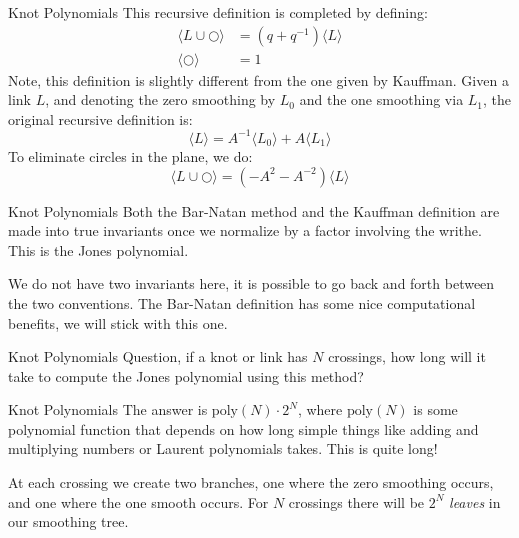 \documentclass{beamer}
\begin{document}
    \begin{frame}{Knot Polynomials}
        This recursive definition is completed by defining:
        \begin{align}
            \langle{L\cup{\bigcirc}}\rangle
            &=(q+q^{-1})\langle{L}\rangle\\
            \langle{\bigcirc}\rangle&=1
        \end{align}
        Note, this definition is slightly different from the one given by
        Kauffman. Given a link $L$, and denoting the zero smoothing by
        $L_{0}$ and the one smoothing via $L_{1}$, the original recursive
        definition is:
        \begin{equation}
            \langle{L}\rangle
            =A^{-1}\langle{L_{0}}\rangle+A\langle{L_{1}}\rangle
        \end{equation}
        To eliminate circles in the plane, we do:
        \begin{equation}
            \langle{L\cup\bigcirc}\rangle
            =(-A^{2}-A^{-2})\langle{L}\rangle
        \end{equation}
    \end{frame}
    \begin{frame}{Knot Polynomials}
        Both the Bar-Natan method and the Kauffman definition are made into
        true invariants once we normalize by a factor involving the writhe.
        This is the Jones polynomial.
        \par\hfill\par
        We do not have two invariants here, it is possible to go back and
        forth between the two conventions. The Bar-Natan definition has some
        nice computational benefits, we will stick with this one.
    \end{frame}
    \begin{frame}{Knot Polynomials}
        Question, if a knot or link has $N$ crossings, how long will it take
        to compute the Jones polynomial using this method?
    \end{frame}
    \begin{frame}{Knot Polynomials}
        The answer is $\textrm{poly}(N)\cdot{2}^{N}$, where
        $\textrm{poly}(N)$ is some polynomial function that depends on how
        long simple things like adding and multiplying numbers or
        Laurent polynomials takes. This is quite long!
        \par\hfill\par
        At each crossing we create two branches, one where the zero smoothing
        occurs, and one where the one smooth occurs. For $N$ crossings there
        will be $2^{N}$ \textit{leaves} in our smoothing tree.
    \end{frame}
\end{document}
